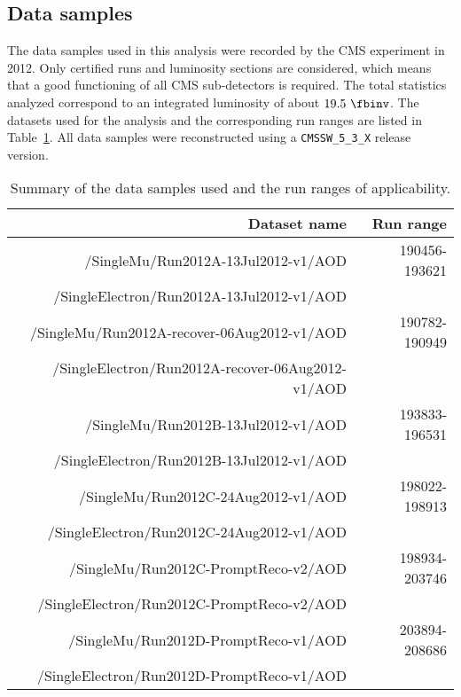 \subsection{Data samples}
The data samples used in this analysis were recorded by the CMS experiment in 2012.
Only certified runs and luminosity sections are considered, which means that a good functioning
of all CMS sub-detectors is required. The total statistics analyzed correspond to an integrated
luminosity of about $19.5~\fbinv$.
The datasets used for the analysis and the corresponding run ranges are listed in Table~\ref{tab:datasets}.
All data samples were reconstructed using a \texttt{CMSSW\_5\_3\_X} release version.
\begin{table}[htbp!]
  \begin{center}
  \begin{tabular}{r|r}
  \hline  \hline
  Dataset name & Run range \\
  \hline
  /SingleMu/Run2012A-13Jul2012-v1/AOD         & 190456-193621  \\
  /SingleElectron/Run2012A-13Jul2012-v1/AOD   &            \\
  \hline
  /SingleMu/Run2012A-recover-06Aug2012-v1/AOD        &  190782-190949  \\
  /SingleElectron/Run2012A-recover-06Aug2012-v1/AOD  &     \\
  \hline
  /SingleMu/Run2012B-13Jul2012-v1/AOD         &  193833-196531  \\
  /SingleElectron/Run2012B-13Jul2012-v1/AOD   &         \\
  \hline
  /SingleMu/Run2012C-24Aug2012-v1/AOD       & 198022-198913 \\
  /SingleElectron/Run2012C-24Aug2012-v1/AOD & \\
  \hline
  /SingleMu/Run2012C-PromptReco-v2/AOD       & 198934-203746 \\
  /SingleElectron/Run2012C-PromptReco-v2/AOD & \\
  \hline
  /SingleMu/Run2012D-PromptReco-v1/AOD       & 203894-208686 \\
  /SingleElectron/Run2012D-PromptReco-v1/AOD & \\
  \hline  \hline
  \end{tabular}
  \end{center}
  \caption{Summary of the data samples used and the run ranges of applicability.}
  \label{tab:datasets}
\end{table}%
